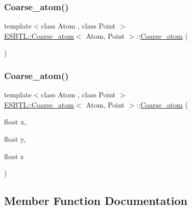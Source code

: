\subsubsection{\texorpdfstring{Coarse\+\_\+atom()}{Coarse\_atom()}\hspace{0.1cm}{\footnotesize\ttfamily [3/4]}}
{\footnotesize\ttfamily template$<$class Atom , class Point $>$ \\
\hyperlink{classESBTL_1_1Coarse__atom}{E\+S\+B\+T\+L\+::\+Coarse\+\_\+atom}$<$ Atom, Point $>$\+::\hyperlink{classESBTL_1_1Coarse__atom}{Coarse\+\_\+atom} (\begin{DoxyParamCaption}{ }\end{DoxyParamCaption})\hspace{0.3cm}{\ttfamily [inline]}}

\mbox{\label{classESBTL_1_1Coarse__atom_a127c90585bdd67131ff4159662bbd917}} 
\subsubsection{\texorpdfstring{Coarse\+\_\+atom()}{Coarse\_atom()}\hspace{0.1cm}{\footnotesize\ttfamily [4/4]}}
{\footnotesize\ttfamily template$<$class Atom , class Point $>$ \\
\hyperlink{classESBTL_1_1Coarse__atom}{E\+S\+B\+T\+L\+::\+Coarse\+\_\+atom}$<$ Atom, Point $>$\+::\hyperlink{classESBTL_1_1Coarse__atom}{Coarse\+\_\+atom} (\begin{DoxyParamCaption}\item[{float}]{x,  }\item[{float}]{y,  }\item[{float}]{z }\end{DoxyParamCaption})\hspace{0.3cm}{\ttfamily [inline]}}



\subsection{Member Function Documentation}
\mbox{\label{classESBTL_1_1Coarse__atom_a4cd2e08c968eac9e00493e4d43e24557}} 
